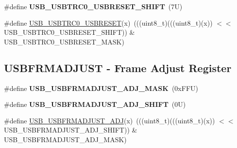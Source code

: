 \begin{DoxyCompactItemize}
\item 
\mbox{\label{group___u_s_b___register___masks_gab20fcb9276a34cbbd33ac0364c419f13}} 
\#define {\bfseries U\+S\+B\+\_\+\+U\+S\+B\+T\+R\+C0\+\_\+\+U\+S\+B\+R\+E\+S\+E\+T\+\_\+\+S\+H\+I\+FT}~(7\+U)
\item 
\#define \mbox{\hyperlink{group___u_s_b___register___masks_ga004b6aa65751423c60c2fecc27798d47}{U\+S\+B\+\_\+\+U\+S\+B\+T\+R\+C0\+\_\+\+U\+S\+B\+R\+E\+S\+ET}}(x)~(((uint8\+\_\+t)(((uint8\+\_\+t)(x)) $<$$<$ U\+S\+B\+\_\+\+U\+S\+B\+T\+R\+C0\+\_\+\+U\+S\+B\+R\+E\+S\+E\+T\+\_\+\+S\+H\+I\+FT)) \& U\+S\+B\+\_\+\+U\+S\+B\+T\+R\+C0\+\_\+\+U\+S\+B\+R\+E\+S\+E\+T\+\_\+\+M\+A\+SK)
\end{DoxyCompactItemize}
\subsection*{U\+S\+B\+F\+R\+M\+A\+D\+J\+U\+ST -\/ Frame Adjust Register}
\begin{DoxyCompactItemize}
\item 
\mbox{\label{group___u_s_b___register___masks_ga3bbdc3dbdf46947a16a7b4429ad9a0c7}} 
\#define {\bfseries U\+S\+B\+\_\+\+U\+S\+B\+F\+R\+M\+A\+D\+J\+U\+S\+T\+\_\+\+A\+D\+J\+\_\+\+M\+A\+SK}~(0x\+F\+F\+U)
\item 
\mbox{\label{group___u_s_b___register___masks_ga81985f8c59f9aa0c0340a70136b55098}} 
\#define {\bfseries U\+S\+B\+\_\+\+U\+S\+B\+F\+R\+M\+A\+D\+J\+U\+S\+T\+\_\+\+A\+D\+J\+\_\+\+S\+H\+I\+FT}~(0\+U)
\item 
\#define \mbox{\hyperlink{group___u_s_b___register___masks_ga9425a289b2e719d6aad583a33ddf1e4b}{U\+S\+B\+\_\+\+U\+S\+B\+F\+R\+M\+A\+D\+J\+U\+S\+T\+\_\+\+A\+DJ}}(x)~(((uint8\+\_\+t)(((uint8\+\_\+t)(x)) $<$$<$ U\+S\+B\+\_\+\+U\+S\+B\+F\+R\+M\+A\+D\+J\+U\+S\+T\+\_\+\+A\+D\+J\+\_\+\+S\+H\+I\+FT)) \& U\+S\+B\+\_\+\+U\+S\+B\+F\+R\+M\+A\+D\+J\+U\+S\+T\+\_\+\+A\+D\+J\+\_\+\+M\+A\+SK)
\end{DoxyCompactItemize}
